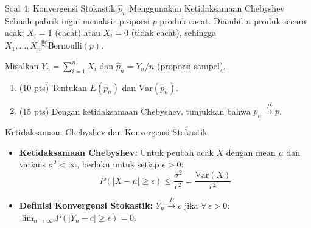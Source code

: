 \documentclass[10pt,twoside]{article}
\begin{document}
\begin{soalbox}{Soal 4: Konvergensi Stokastik $\hat{p}_n$ Menggunakan Ketidaksamaan Chebyshev}
Sebuah pabrik ingin menaksir proporsi $p$ produk cacat. Diambil $n$ produk secara acak:
$X_i = 1$ (cacat) atau $X_i = 0$ (tidak cacat), sehingga $X_1, \dots, X_n \overset{\mathrm{iid}}{\sim} \mathrm{Bernoulli}(p)$.

Misalkan $Y_n = \displaystyle\sum_{i=1}^{n} X_i$ dan $\hat{p}_n = Y_n / n$ (proporsi sampel).
\begin{enumerate}[label=(\alph*)]
  \item (10 pts) Tentukan $E(\hat{p}_n)$ dan $\mathrm{Var}(\hat{p}_n)$.
  \item (15 pts) Dengan ketidaksamaan Chebyshev, tunjukkan bahwa $\hat{p}_n \xrightarrow{P} p$.
\end{enumerate}
\end{soalbox}

\begin{tipbox}{Ketidaksamaan Chebyshev dan Konvergensi Stokastik}
\begin{itemize}
  \item \textbf{Ketidaksamaan Chebyshev:} Untuk peubah acak $X$ dengan mean $\mu$ dan varians $\sigma^2 < \infty$, berlaku untuk setiap $\epsilon > 0$:
  \[
  P(|X - \mu| \ge \epsilon) \le \frac{\sigma^2}{\epsilon^2} = \frac{\mathrm{Var}(X)}{\epsilon^2}
  \]
  \item \textbf{Definisi Konvergensi Stokastik:} $Y_n \xrightarrow{P} c$ jika $\forall\, \epsilon > 0$: $\lim_{n \to \infty} P(|Y_n - c| \ge \epsilon) = 0$.
\end{itemize}
\end{tipbox}
\end{document}
